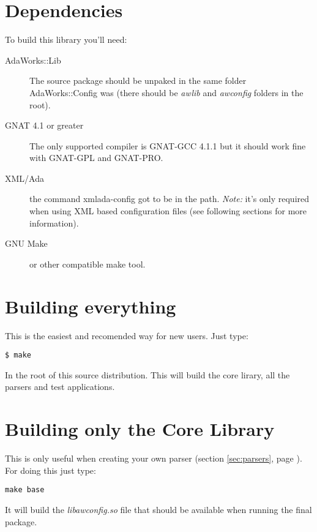 \documentclass[a4paper]{book}
\begin{document}
\section{Dependencies}
\label{sec:building:dependencies}


	To build this library you'll need: \\

	\begin{description}
		\item[AdaWorks::Lib] The source package should be unpaked in the same folder AdaWorks::Config was (there should be \emph{awlib} and \emph{awconfig} folders in the root).
		\item[GNAT 4.1 or greater] The only supported compiler is GNAT-GCC 4.1.1 but it should work fine with GNAT-GPL and GNAT-PRO.
	
		\item[XML/Ada] the command xmlada-config got to be in the path. \emph{Note:} it's only required when using XML based configuration files (see following sections for more information).
		\item[GNU Make] or other compatible make tool.
	\end{description}



\section{Building everything}
\label{sec:buildig:everything}



	This is the easiest and recomended way for new users. Just type:
	\begin{verbatim}
$ make
\end{verbatim}
	In the root of this source distribution. This will build the core lirary, all the parsers and test applications.

\section{Building only the Core Library}
\label{sec:building:core}

	
	This is only useful when creating your own parser (section \ref{sec:parsers}, page \pageref{sec:parsers}). For doing this just type:
	\begin{verbatim}
make base
\end{verbatim}


	It will build the \emph{libawconfig.so} file that should be available when running the final package.
\end{document}

